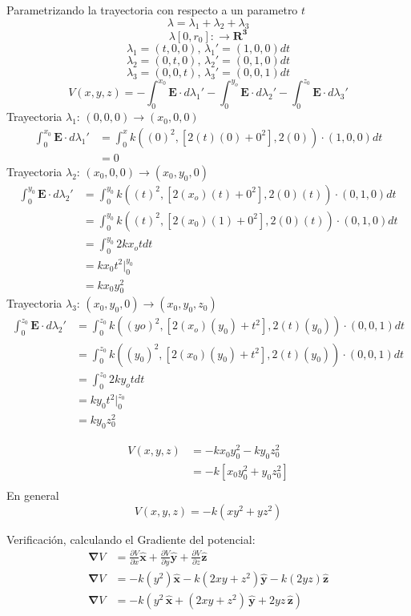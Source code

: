 \documentclass[12pt]{article}
\begin{document}
Parametrizando  la trayectoria con respecto a un parametro \(t\) 
\[ \lambda = \lambda_1 + \lambda_2 + \lambda_3\]
\[
\lambda[0, r_0]: \longrightarrow  \mathbf{R^3}   
\]
\[ \lambda_1 = (t,0,0),\, \lambda_1' = (1,0,0)dt \]
\[ \lambda_2 = (0,t,0),\, \lambda_2' = (0,1,0)dt \]
\[ \lambda_3 = (0,0,t),\, \lambda_3' = (0,0,1)dt \]
\[
V(x,y,z) = -\int_0^{x_0} \mathbf{E}\cdot d \lambda_1' -\int_0^{y_o} \mathbf{E}\cdot d \lambda_2'-\int_0^{z_0} \mathbf{E}\cdot d \lambda_3'
\]
Trayectoria \(\lambda_1\): \((0,0,0) \to (x_0,0,0)\)
\begin{align*}
    \int_0^{x_0} \mathbf{E}\cdot d \lambda_1'& =  \int_0^x k((0)^2,[2(t)(0) + 0^2],2(0)) \cdot (1,0,0)dt\\
& = 0
\end{align*}
Trayectoria \(\lambda_2\): \((x_0,0,0) \to (x_0,y_0,0)\)
\begin{align*}
    \int_0^{y_0} \mathbf{E}\cdot d \lambda_2'& =  \int_0^{y_0} k((t)^2,[2(x_o)(t) + 0^2],2(0)(t)) \cdot (0,1,0)dt\\
& = \int_0^{y_0} k((t)^2,[2(x_0)(1) + 0^2],2(0)(t)) \cdot (0,1,0)dt\\
& = \int_0^{y_0} 2kx_o t dt\\
& = kx_0 t^2 \bigg|_0^{y_0} \\
& = kx_0 y_0^2
\end{align*}
Trayectoria \(\lambda_3\): \((x_0,y_0,0) \to (x_0,y_0,z_0)\) 
\begin{align*}
    \int_0^{z_0} \mathbf{E}\cdot d \lambda_2'& =  \int_0^{z_0} k((yo)^2,[2(x_o)(y_0) + t^2],2(t)(y_0)) \cdot (0,0,1)dt\\
& = \int_0^{z_0} k((y_0)^2,[2(x_0)(y_0) + t^2],2(t)(y_0)) \cdot (0,0,1)dt\\
& = \int_0^{z_0} 2ky_o t dt\\
& = ky_0 t^2 \bigg|_0^{z_0} \\
& = ky_0 z_0^2
\end{align*}

\begin{align*}
    V(x,y,z)& = -kx_0 y_0^2 - ky_0 z_0^2\\
& =-k[x_0y_0^2 + y_0z_0^2] \\
\end{align*}
En general 
\[\boxed{ V(x,y,z) = -k(xy^2 + yz^2)}\]


Verificación, calculando el Gradiente del potencial:
\begin{align*}
    \mathbf{ \nabla}V & = \frac{\partial V}{\partial x} \hat{\mathbf{x} } + \frac{\partial V}{\partial y}  \hat{\mathbf{y} } + \frac{\partial V}{\partial z}  \hat{\mathbf{z} }\\
    \mathbf{ \nabla }V & = -k(y^2)\hat{\mathbf{x} } -k(2xy + z^2)\hat{\mathbf{y} } -k(2yz)\hat{\mathbf{z} } \\
    \mathbf{ \nabla }V  & = -k\left(y^2\,\hat{\mathbf{x}} + (2xy + z^2)\,\hat{\mathbf{y}} + 2yz\,\hat{\mathbf{z}}\right) 
\end{align*}
\end{document}
